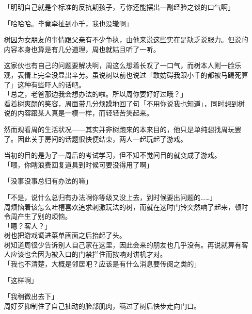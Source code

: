 「明明自己就是个标准的反抗期孩子，亏你还能摆出一副经验之谈的口气啊」

「哈哈哈。毕竟牵扯到小千，我也没辙啊」

树因为女朋友的事情跟父亲有不少争执，由他来说这些实在是缺乏说服力。但说的内容本身也算是有几分道理，周也就姑且听了一听。

这家伙也有自己的问题要解决啊，周这么想着长叹了一口气，而树本人则一脸乐观，表情上完全没显出辛劳。虽说树以前也说过「敢妨碍我跟小千的都被马踢死算了」这种有些吓人的话吧。\\

「总之，老爸那边我会想办法的啦。所以周你要好好过哦？」\\

看着树爽朗的笑容，周面带几分烦躁地回了句「不用你说我也知道」，同时想到树说的内容跟某人真是一模一样，而轻轻苦笑起来。\\

\vspace{2\baselineskip}

然而观看周的生活状况——其实并非树跑来的本来目的，他只是单纯想找周玩罢了。因此关于房间的话题很快便结束，两人一起玩起了游戏。

当初的目的是为了一周后的考试学习，但不知不觉间目的就变成了游戏。\\

「喂，你瞎浪费回复道具到时候可要没得用了啊」

「没事没事总归有办法的嘛」

「不是，说什么总归有办法啊你等级又没上去，到时候要出问题的……」\\

周烦恼着该怎么吐槽喜欢追求刺激玩法的树，而就在这时门铃突然响了起来，顿时令周产生了别的烦恼。\\

「嗯？客人？」\\

树也把游戏调进菜单画面之后抬起了头。\\

树知道周很少告诉别人自己家在这里，因此会来的朋友也几乎没有。再说就算有客人应该也会因为被入口的门禁拦住而按响对讲机才对。\\

「我也不清楚，大概是邻居吧？应该是有什么消息要传阅之类的」

「这样啊」

「我稍微出去下」\\

周好歹抑制住了自己抽动的脸部肌肉，瞒过了树后快步走向门口。\\

